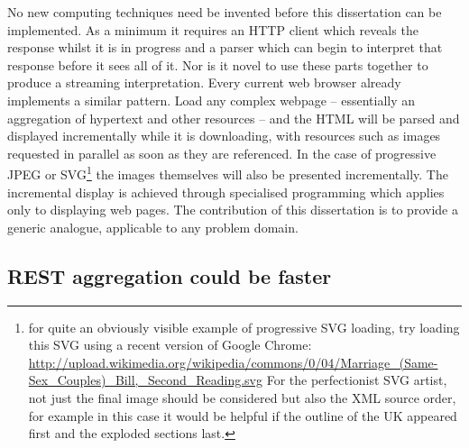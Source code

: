\documentclass[12pt, ]{article}
\begin{document}
No new computing techniques need be invented before this dissertation
can be implemented. As a minimum it requires an HTTP client which
reveals the response whilst it is in progress and a parser which can
begin to interpret that response before it sees all of it. Nor is it
novel to use these parts together to produce a streaming interpretation.
Every current web browser already implements a similar pattern. Load any
complex webpage -- essentially an aggregation of hypertext and other
resources -- and the HTML will be parsed and displayed incrementally
while it is downloading, with resources such as images requested in
parallel as soon as they are referenced. In the case of progressive JPEG
or SVG\footnote{for quite an obviously visible example of progressive
  SVG loading, try loading this SVG using a recent version of Google
  Chrome:
  \url{http://upload.wikimedia.org/wikipedia/commons/0/04/Marriage_(Same-Sex_Couples)_Bill,_Second_Reading.svg}
  For the perfectionist SVG artist, not just the final image should be
  considered but also the XML source order, for example in this case it
  would be helpful if the outline of the UK appeared first and the
  exploded sections last.} the images themselves will also be presented
incrementally. The incremental display is achieved through specialised
programming which applies only to displaying web pages. The contribution
of this dissertation is to provide a generic analogue, applicable to any
problem domain.

\subsection{REST aggregation could be
faster}\label{rest-aggregation-could-be-faster}
\end{document}
